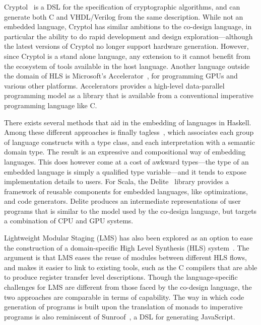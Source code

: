 \documentclass[../paper.tex]{subfiles}
\begin{document}

Cryptol~\cite{cryptol} is a DSL for the specification of cryptographic algorithms, and can generate both C and VHDL/Verilog from the same description. While not an embedded language, Cryptol has similar ambitions to the co-design language, in particular the ability to do rapid development and design exploration---although the latest versions of Cryptol no longer support hardware generation. However, since Cryptol is a stand alone language, any extension to it cannot benefit from the ecosystem of tools available in the host language. Another language outside the domain of HLS is Microsoft's Accelerator~\cite{accelerator}, for programming GPUs and various other platforms. Accelerators provides a high-level data-parallel programming model as a library that is available from a conventional imperative programming language like C.

There exists several methods that aid in the embedding of languages in Haskell. Among these different approaches is finally tagless~\cite{carette2009}, which associates each group of language constructs with a type class, and each interpretation with a semantic domain type. The result is an expressive and compositional way of embedding languages. This does however come at a cost of awkward types---the type of an embedded language is simply a qualified type variable---and it tends to expose implementation details to users. For Scala, the Delite~\cite{arvind2014} library provides a framework of reusable components for embedded languages, like optimizations, and code generators. Delite produces an intermediate representations of user programs that is similar to the model used by the co-design language, but targets a combination of CPU and GPU systems.

Lightweight Modular Staging (LMS) has also been explored as an option to ease the construction of a domain-specific High Level Synthesis (HLS) system~\cite{george2013}. The argument is that LMS eases the reuse of modules between different HLS flows, and makes it easier to link to existing tools, such as the C compilers that are able to produce register transfer level descriptions. Though the language-specific challenges for LMS are different from those faced by the co-design language, the two approaches are comparable in terms of capability. The way in which code generation of programs is built upon the translation of monads to imperative programs is also reminiscent of Sunroof~\cite{gill2014}, a DSL for generating JavaScript.
\end{document}
